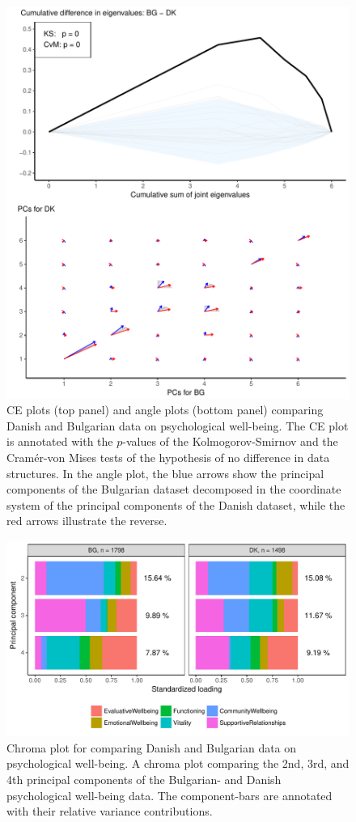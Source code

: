 \documentclass[a4paper,12pt]{article}
\begin{document}
\begin{figure}[H]
\center
\includegraphics[scale=0.8]{Figure6_v3.pdf}
\caption{CE plots (top panel) and angle plots (bottom panel) comparing Danish and Bulgarian data on psychological well-being. The CE plot is annotated with the $p$-values of the Kolmogorov-Smirnov and the Cram\'er-von Mises tests of the hypothesis of no difference in data structures. In the angle plot, the blue arrows show the principal components of the Bulgarian dataset decomposed in the coordinate system of the principal components of the Danish dataset, while the red arrows illustrate the reverse.}
\label{plotBG.cehair}
\end{figure}

\begin{figure}[H]
\center
\includegraphics[scale=0.8]{Figure7_v3.pdf}
\caption{Chroma plot for comparing Danish and Bulgarian data on psychological well-being. A chroma plot comparing the 2nd, 3rd, and 4th principal components of the Bulgarian- and Danish psychological well-being data. The component-bars are annotated with their relative variance contributions. }
\label{plotBG.pancake}
\end{figure}
\end{document}
